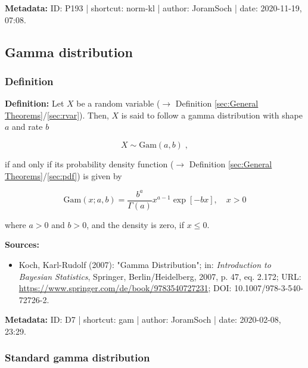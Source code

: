 \documentclass[a4paper,12pt,twoside]{book}
\begin{document}
\vspace{1em}
\textbf{Metadata:} ID: P193 | shortcut: norm-kl | author: JoramSoch | date: 2020-11-19, 07:08.
\vspace{1em}



\subsection{Gamma distribution}

\subsubsection[\textit{Definition}]{Definition} \label{sec:gam}
\setcounter{equation}{0}

\textbf{Definition:} Let $X$ be a random variable ($\rightarrow$ Definition \ref{sec:General Theorems}/\ref{sec:rvar}). Then, $X$ is said to follow a gamma distribution with shape $a$ and rate $b$

\begin{equation} \label{eq:gam-gam}
X \sim \mathrm{Gam}(a, b) \; ,
\end{equation}

if and only if its probability density function ($\rightarrow$ Definition \ref{sec:General Theorems}/\ref{sec:pdf}) is given by

\begin{equation} \label{eq:gam-gam-pdf}
\mathrm{Gam}(x; a, b) = \frac{b^a}{\Gamma(a)} x^{a-1} \exp[-b x], \quad x > 0
\end{equation}

where $a > 0$ and $b > 0$, and the density is zero, if $x \leq 0$.


\vspace{1em}
\textbf{Sources:}
\begin{itemize}
\item Koch, Karl-Rudolf (2007): "Gamma Distribution"; in: \textit{Introduction to Bayesian Statistics}, Springer, Berlin/Heidelberg, 2007, p. 47, eq. 2.172; URL: \url{https://www.springer.com/de/book/9783540727231}; DOI: 10.1007/978-3-540-72726-2.
\end{itemize}


\vspace{1em}
\textbf{Metadata:} ID: D7 | shortcut: gam | author: JoramSoch | date: 2020-02-08, 23:29.
\vspace{1em}



\subsubsection[\textit{Standard gamma distribution}]{Standard gamma distribution} \label{sec:sgam}
\setcounter{equation}{0}
\end{document}
